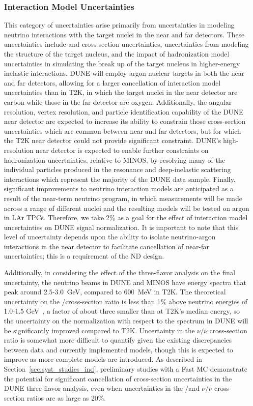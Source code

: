 \subsubsection{Interaction Model Uncertainties}
\label{sec:syst_just_sim}
This category of uncertainties arise primarily from uncertainties in modeling neutrino interactions with the target
nuclei in the near and far detectors. These uncertainties include \nue and \numu cross-section uncertainties,
uncertainties from modeling the structure of the target nucleus, and the impact of
hadronization model uncertainties in simulating the break up of the target nucleus in higher-energy inelastic
interactions. DUNE will employ argon nuclear targets in both the near and far detectors, allowing for a larger
cancellation of interaction model uncertainties than in T2K, in which the target nuclei in the near detector are
carbon while those in the far detector are oxygen. Additionally, the angular resolution, vertex resolution,
and particle identification capability of the DUNE near detector are expected to increase its ability to
constrain those cross-section uncertainties which are common between near and far detectors, but for which
the T2K near detector could not provide significant constraint. DUNE's high-resolution near
detector is expected to enable further constraints on hadronization uncertainties, relative to MINOS, by
resolving many of the individual particles produced in the resonance and deep-inelastic scattering interactions
which represent the majority of the DUNE data sample. Finally, significant improvements to neutrino interaction
models are anticipated as a result of the near-term neutrino program, in which measurements will be made
across a range of different nuclei and the resulting models will be tested on argon in LAr TPCs.
Therefore, we take 2\% as a goal for the effect of
interaction model uncertainties on DUNE \nue signal normalization. It is important to note that this level of
uncertainty depends upon the ability to isolate neutrino-argon interactions in the near detector to facilitate
cancellation of near-far uncertainties; this is a requirement of the ND design.

Additionally, in considering the effect of the three-flavor analysis on the final uncertainty,
the neutrino beams in DUNE and MINOS have energy
spectra that peak around 2.5-3.0~GeV, compared to 600~MeV in T2K. 
The theoretical uncertainty on the \nue/\numu cross-section ratio is
less than 1\% above neutrino energies of 1.0-1.5 GeV~\cite{Day-McFarland:2012},
a factor of about three smaller than at T2K's median energy,
so the uncertainty on the \nue normalization with respect to the \numu spectrum in DUNE will be
significantly improved compared to T2K. Uncertainty in the $\nu/\bar{\nu}$ cross-section ratio is
somewhat more difficult to quantify given the existing discrepancies between data and currently
implemented models, though this is expected to improve as more complete models are introduced.
As described in Section~\ref{sec:syst_studies_ind}, preliminary studies with a
Fast MC demonstrate the potential for significant cancellation of cross-section uncertainties
in the DUNE three-flavor
analysis, even when uncertainties in the \nue/\numu and $\nu/\bar\nu$ cross-section ratios
are as large as 20\%.

